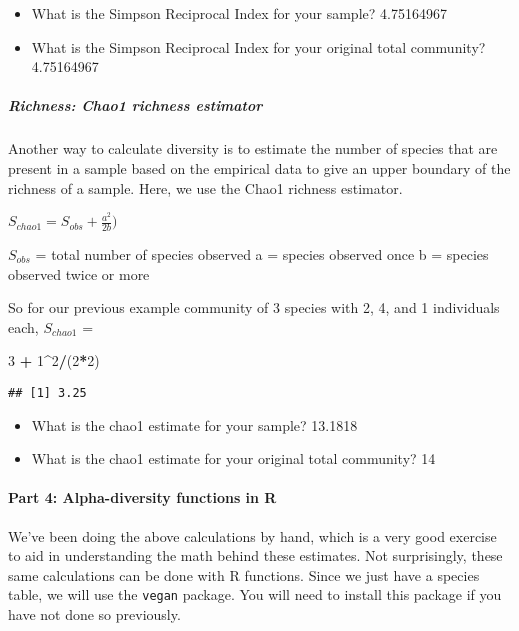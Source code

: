 \documentclass[]{article}
\newenvironment{Shaded}{\begin{snugshade}}{\end{snugshade}}
\newcommand{\DecValTok}[1]{\textcolor[rgb]{0.00,0.00,0.81}{#1}}
\newcommand{\StringTok}[1]{\textcolor[rgb]{0.31,0.60,0.02}{#1}}
\newcommand{\OperatorTok}[1]{\textcolor[rgb]{0.81,0.36,0.00}{\textbf{#1}}}
\newcommand{\NormalTok}[1]{#1}
\providecommand{\tightlist}{%
  \setlength{\itemsep}{0pt}\setlength{\parskip}{0pt}}
\let\oldparagraph\paragraph
\renewcommand{\paragraph}[1]{\oldparagraph{#1}\mbox{}}
\let\oldsubparagraph\subparagraph
\renewcommand{\subparagraph}[1]{\oldsubparagraph{#1}\mbox{}}
\begin{document}
\begin{itemize}
\tightlist
\item
  What is the Simpson Reciprocal Index for your sample? 4.75164967
\item
  What is the Simpson Reciprocal Index for your original total
  community? 4.75164967
\end{itemize}

\subparagraph{Richness: Chao1 richness
estimator}\label{richness-chao1-richness-estimator}

Another way to calculate diversity is to estimate the number of species
that are present in a sample based on the empirical data to give an
upper boundary of the richness of a sample. Here, we use the Chao1
richness estimator.

\(S_{chao1} = S_{obs} + \frac{a^2}{2b})\)

\(S_{obs}\) = total number of species observed a = species observed once
b = species observed twice or more

So for our previous example community of 3 species with 2, 4, and 1
individuals each, \(S_{chao1}\) =

\begin{Shaded}
\begin{Highlighting}[]
\DecValTok{3} \OperatorTok{+}\StringTok{ }\DecValTok{1}\OperatorTok{^}\DecValTok{2}\OperatorTok{/}\NormalTok{(}\DecValTok{2}\OperatorTok{*}\DecValTok{2}\NormalTok{)}
\end{Highlighting}
\end{Shaded}

\begin{verbatim}
## [1] 3.25
\end{verbatim}

\begin{itemize}
\tightlist
\item
  What is the chao1 estimate for your sample? 13.1818
\item
  What is the chao1 estimate for your original total community? 14
\end{itemize}

\paragraph{Part 4: Alpha-diversity functions in
R}\label{part-4-alpha-diversity-functions-in-r}

We've been doing the above calculations by hand, which is a very good
exercise to aid in understanding the math behind these estimates. Not
surprisingly, these same calculations can be done with R functions.
Since we just have a species table, we will use the \texttt{vegan}
package. You will need to install this package if you have not done so
previously.
\end{document}
